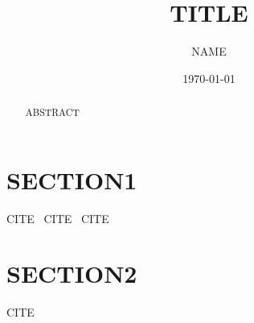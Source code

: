 \documentclass[prb,aps,floatfix,twocolumn,amsmath,amssymb,superscriptaddress]{revtex4-2}
\begin{document}
\title{TITLE}
\author{NAME}
\date{\today}

\begin{abstract}
ABSTRACT
\end{abstract}

\maketitle

\section{SECTION1}

CITE~\cite{kohn1965}
CITE~\cite{hohenberg1964}
CITE~\cite{perdew1981}

\section{SECTION2}

CITE~\cite{ceperley1980,bardeen1957,weinberg1967}



\end{document}
